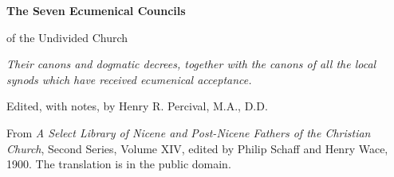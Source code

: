 \documentclass[11pt,letterpaper]{article}
\begin{document}
\color{ink}

\begin{titlepage}
\centering
\vspace*{4em}
{\LARGE\bfseries\color{heading} The Seven Ecumenical Councils\par}
\vspace{1em}
{\large of the Undivided Church\par}
\vspace{2em}
{\itshape\color{subhead} Their canons and dogmatic decrees, together with the
canons of all the local synods which have received ecumenical
acceptance.\par}
\vspace{3em}
{Edited, with notes, by Henry R. Percival, M.A., D.D.\par}
\vfill
{\small From \emph{A Select Library of Nicene and Post-Nicene Fathers of the
Christian Church}, Second Series, Volume XIV, edited by Philip Schaff and
Henry Wace, 1900. The translation is in the public domain.\par}
\vspace{2em}
\end{titlepage}

\tableofcontents


\end{document}
